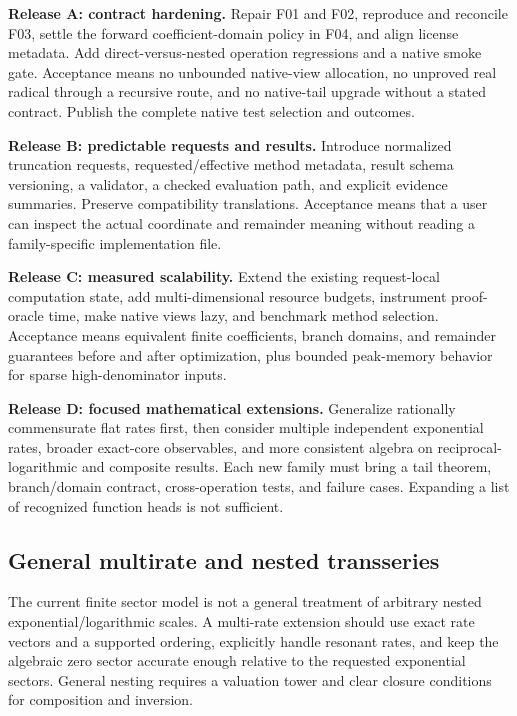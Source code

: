 \textbf{Release A: contract hardening.} Repair F01 and F02, reproduce and reconcile F03, settle the forward coefficient-domain policy in F04, and align license metadata. Add direct-versus-nested operation regressions and a native smoke gate. Acceptance means no unbounded native-view allocation, no unproved real radical through a recursive route, and no native-tail upgrade without a stated contract. Publish the complete native test selection and outcomes.

\textbf{Release B: predictable requests and results.} Introduce normalized truncation requests, requested/effective method metadata, result schema versioning, a validator, a checked evaluation path, and explicit evidence summaries. Preserve compatibility translations. Acceptance means that a user can inspect the actual coordinate and remainder meaning without reading a family-specific implementation file.

\textbf{Release C: measured scalability.} Extend the existing request-local computation state, add multi-dimensional resource budgets, instrument proof-oracle time, make native views lazy, and benchmark method selection. Acceptance means equivalent finite coefficients, branch domains, and remainder guarantees before and after optimization, plus bounded peak-memory behavior for sparse high-denominator inputs.

\textbf{Release D: focused mathematical extensions.} Generalize rationally commensurate flat rates first, then consider multiple independent exponential rates, broader exact-core observables, and more consistent algebra on reciprocal-logarithmic and composite results. Each new family must bring a tail theorem, branch/domain contract, cross-operation tests, and failure cases. Expanding a list of recognized function heads is not sufficient.

\subsection{General multirate and nested transseries}

The current finite sector model is not a general treatment of arbitrary nested exponential/logarithmic scales. A multi-rate extension should use exact rate vectors and a supported ordering, explicitly handle resonant rates, and keep the algebraic zero sector accurate enough relative to the requested exponential sectors. General nesting requires a valuation tower and clear closure conditions for composition and inversion.

